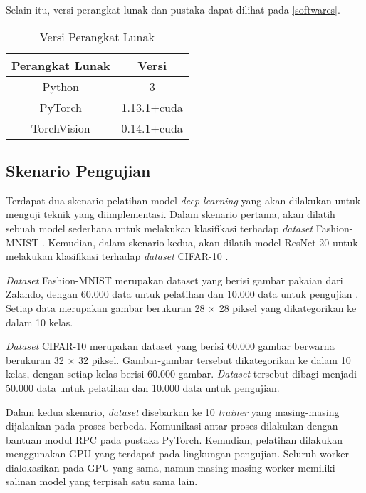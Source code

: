 Selain itu, versi perangkat lunak dan pustaka dapat dilihat pada \autoref{softwares}.
\begin{table}[H]
  \caption{Versi Perangkat Lunak}\label{softwares}
  \centering
  \begin{tabular}{ | c | c | }
    \hline
    \textbf{Perangkat Lunak} & \textbf{Versi} \\
    \hline
    Python                   & 3              \\
    \hline
    PyTorch                  & 1.13.1+cuda    \\
    \hline
    TorchVision              & 0.14.1+cuda    \\
    \hline
  \end{tabular}
\end{table}

\subsection{Skenario Pengujian}
Terdapat dua skenario pelatihan model \emph{deep learning} yang akan dilakukan untuk menguji teknik yang diimplementasi. Dalam skenario pertama, akan dilatih sebuah model sederhana untuk melakukan klasifikasi terhadap \emph{dataset} Fashion-MNIST \parencite{xiao2017fashion}. Kemudian, dalam skenario kedua, akan dilatih model ResNet-20 \parencite{he2015deep} untuk melakukan klasifikasi terhadap \emph{dataset} CIFAR-10 \parencite{krizhevsky2009cifar}.

\emph{Dataset} Fashion-MNIST merupakan dataset yang berisi gambar pakaian dari Zalando, dengan 60.000 data untuk pelatihan dan 10.000 data untuk pengujian \parencite{xiao2017fashion}. Setiap data merupakan gambar berukuran 28 $\times$ 28 piksel yang dikategorikan ke dalam 10 kelas.

\emph{Dataset} CIFAR-10 merupakan dataset yang berisi 60.000 gambar berwarna berukuran 32 $\times$ 32 piksel. Gambar-gambar tersebut dikategorikan ke dalam 10 kelas, dengan setiap kelas berisi 60.000 gambar. \emph{Dataset} tersebut dibagi menjadi 50.000 data untuk pelatihan dan 10.000 data untuk pengujian.

Dalam kedua skenario, \emph{dataset} disebarkan ke 10 \emph{trainer} yang masing-masing dijalankan pada proses berbeda. Komunikasi antar proses dilakukan dengan bantuan modul RPC pada pustaka PyTorch. Kemudian, pelatihan dilakukan menggunakan GPU yang terdapat pada lingkungan pengujian. Seluruh worker dialokasikan pada GPU yang sama, namun masing-masing worker memiliki salinan model yang terpisah satu sama lain.

